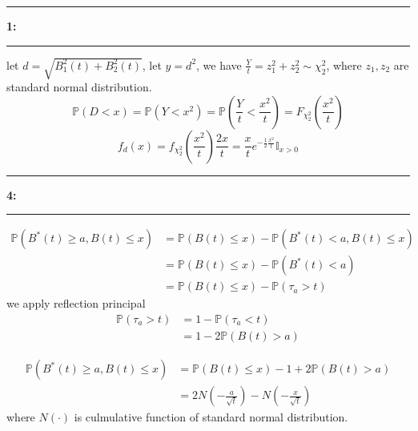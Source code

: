 \documentclass[11pt]{article}
\newcommand\question[2]{\vspace{.25in}\hrule\textbf{#1: #2}\vspace{.5em}\hrule\vspace{.10in}}
\begin{document}
\raggedright
\newcommand\NAME{Group 5}
\newcommand\MEMBERS{Wenxin Shi, Mingxiang Jia, Leyao Zhang, Chenyu Zhao}
\newcommand\HWNUM{1}



\question{1}{}
let $d=\sqrt{B_1^2(t)+B_2^2(t)}$, let $y=d^2$, we have $\frac{Y}{t}=z_1^2+z_2^2\sim \chi_2^2$, where $z_1,z_2$ are standard normal distribution.
$$
\mathbb{P}(D<x)=\mathbb{P}(Y<x^2)=\mathbb{P}(\frac{Y}{t}<\frac{x^2}{t})=F_{\chi_2^2}(\frac{x^2}{t})
$$
$$
f_d(x)=f_{\chi_2^2}(\frac{x^2}{t})\frac{2x}{t}=\frac{x}{t}e^{-\frac{1}{2}\frac{x^2}{t}}\mathbb{I}_{x>0}
$$


\question{4}{}
$$
\begin{aligned}
\mathbb{P}(B^*(t)\ge a,B(t)\le x)&=\mathbb{P}(B(t)\le x)-\mathbb{P}(B^*(t)<a,B(t)\le x)\\
&=\mathbb{P}(B(t)\le x)-\mathbb{P}(B^*(t)<a)\\
&=\mathbb{P}(B(t)\le x)-\mathbb{P}(\tau_a>t)
\end{aligned}
$$
we apply reflection principal
$$
\begin{aligned}
\mathbb{P}(\tau_a>t)&=1-\mathbb{P}(\tau_a<t)\\
&=1-2\mathbb{P}(B(t)>a)
\end{aligned}
$$


$$
\begin{aligned}
\mathbb{P}(B^*(t)\ge a,B(t)\le x)&=\mathbb{P}(B(t)\le x)-1+2\mathbb{P}(B(t)>a)\\
&=2N(-\frac{a}{\sqrt{t}})-N(-\frac{x}{\sqrt{t}})
\end{aligned}
$$
where $N(\cdot)$ is culmulative function of standard normal distribution.


	
\end{document}
